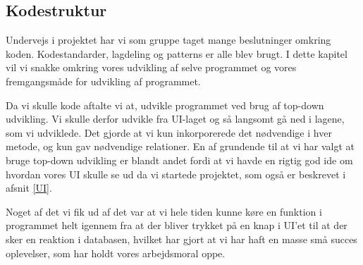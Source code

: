 \subsection{Kodestruktur}

Undervejs i projektet har vi som gruppe taget mange beslutninger omkring koden.
Kodestandarder, lagdeling og patterns er alle blev brugt.
I dette kapitel vil vi snakke omkring vores udvikling af selve programmet og vores fremgangsmåde for udvikling af programmet. 

Da vi skulle kode aftalte vi at, udvikle programmet ved brug af top-down udvikling. Vi skulle derfor udvikle fra UI-laget og så langsomt gå ned i lagene, som vi udviklede. Det gjorde at vi kun inkorporerede det nødvendige i hver metode, og kun gav nødvendige relationer. En af grundende til at vi har valgt at bruge top-down udvikling er blandt andet fordi at vi havde en rigtig god ide om hvordan vores UI skulle se ud da vi startede projektet, som også er beskrevet i afsnit \ref{UI}.

Noget af det vi fik ud af det var at vi hele tiden kunne køre en funktion i programmet helt igennem fra at der bliver trykket på en knap i UI'et til at der sker en reaktion i databasen, hvilket har gjort at vi har haft en masse små succes oplevelser, som har holdt vores arbejdsmoral oppe.